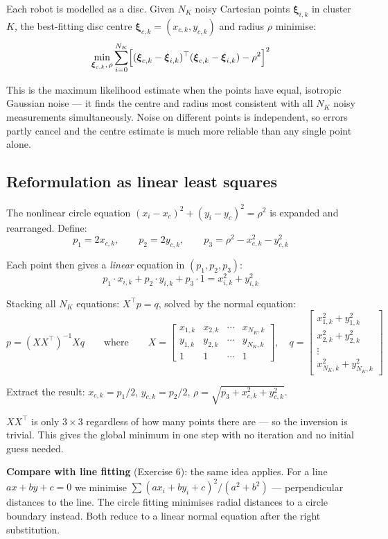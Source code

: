 \documentclass[12pt, a4paper]{article}
\begin{document}
Each robot is modelled as a disc. Given $N_K$ noisy Cartesian points
$\boldsymbol{\xi}_{i,k}$ in cluster $K$, the best-fitting disc centre
$\boldsymbol{\xi}_{c,k} = (x_{c,k}, y_{c,k})$ and radius $\rho$ minimise:
\[
  \min_{\boldsymbol{\xi}_{c,k},\,\rho}
  \sum_{i=0}^{N_K}
  \Bigl[
    (\boldsymbol{\xi}_{c,k} - \boldsymbol{\xi}_{i,k})^\top
    (\boldsymbol{\xi}_{c,k} - \boldsymbol{\xi}_{i,k})
    - \rho^2
  \Bigr]^2
\]

This is the maximum likelihood estimate when the points have equal, isotropic
Gaussian noise --- it finds the centre and radius most consistent with all
$N_K$ noisy measurements simultaneously. Noise on different points is
independent, so errors partly cancel and the centre estimate is much more
reliable than any single point alone.

\subsection*{Reformulation as linear least squares}

The nonlinear circle equation $(x_i - x_c)^2 + (y_i - y_c)^2 = \rho^2$
is expanded and rearranged. Define:
\[
  p_1 = 2x_{c,k}, \qquad p_2 = 2y_{c,k}, \qquad p_3 = \rho^2 - x_{c,k}^2 - y_{c,k}^2
\]

Each point then gives a \emph{linear} equation in $(p_1, p_2, p_3)$:
\[
  p_1\cdot x_{i,k} + p_2\cdot y_{i,k} + p_3\cdot 1 = x_{i,k}^2 + y_{i,k}^2
\]

Stacking all $N_K$ equations: $X^\top p = q$, solved by the normal equation:
\[
  p = (XX^\top)^{-1}Xq
  \qquad \text{where} \qquad
  X =
  \begin{bmatrix}
    x_{1,k} & x_{2,k} & \cdots & x_{N_K,k} \\
    y_{1,k} & y_{2,k} & \cdots & y_{N_K,k} \\
    1       & 1       & \cdots & 1
  \end{bmatrix},
  \quad
  q =
  \begin{bmatrix}
    x_{1,k}^2 + y_{1,k}^2 \\
    x_{2,k}^2 + y_{2,k}^2 \\
    \vdots \\
    x_{N_K,k}^2 + y_{N_K,k}^2
  \end{bmatrix}
\]

Extract the result: $x_{c,k} = p_1/2$, $y_{c,k} = p_2/2$,
$\rho = \sqrt{p_3 + x_{c,k}^2 + y_{c,k}^2}$.

\begin{notebox}
  $XX^\top$ is only $3\times3$ regardless of how many points there are ---
  so the inversion is trivial. This gives the global minimum in one step
  with no iteration and no initial guess needed.

  \textbf{Compare with line fitting} (Exercise 6): the same idea applies.
  For a line $ax+by+c=0$ we minimise
  $\sum(ax_i+by_i+c)^2/(a^2+b^2)$ --- perpendicular distances to the line.
  The circle fitting minimises radial distances to a circle boundary instead.
  Both reduce to a linear normal equation after the right substitution.
\end{notebox}
\end{document}
